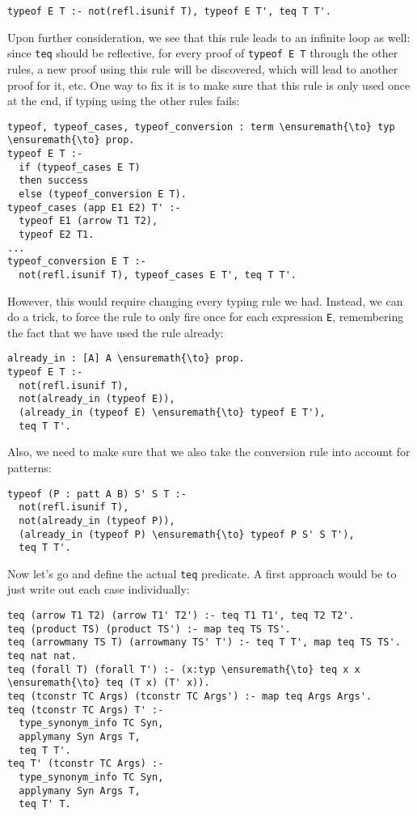 \begin{verbatim}
typeof E T :- not(refl.isunif T), typeof E T', teq T T'.
\end{verbatim}

Upon further consideration, we see that this rule leads to an infinite
loop as well: since \texttt{teq} should be reflective, for every proof
of \texttt{typeof\ E\ T\textquotesingle{}} through the other rules, a
new proof using this rule will be discovered, which will lead to another
proof for it, etc. One way to fix it is to make sure that this rule is
only used once at the end, if typing using the other rules fails:

\begin{verbatim}
typeof, typeof_cases, typeof_conversion : term \ensuremath{\to} typ \ensuremath{\to} prop.
typeof E T :-
  if (typeof_cases E T)
  then success
  else (typeof_conversion E T).
typeof_cases (app E1 E2) T' :-
  typeof E1 (arrow T1 T2),
  typeof E2 T1.
...
typeof_conversion E T :-
  not(refl.isunif T), typeof_cases E T', teq T T'.
\end{verbatim}

However, this would require changing every typing rule we had. Instead,
we can do a trick, to force the rule to only fire once for each
expression \texttt{E}, remembering the fact that we have used the rule
already:

\begin{verbatim}
already_in : [A] A \ensuremath{\to} prop.
typeof E T :-
  not(refl.isunif T),
  not(already_in (typeof E)),
  (already_in (typeof E) \ensuremath{\to} typeof E T'),
  teq T T'.
\end{verbatim}

Also, we need to make sure that we also take the conversion rule into
account for patterns:

\begin{verbatim}
typeof (P : patt A B) S' S T :-
  not(refl.isunif T),
  not(already_in (typeof P)),
  (already_in (typeof P) \ensuremath{\to} typeof P S' S T'),
  teq T T'.
\end{verbatim}

Now let's go and define the actual \texttt{teq} predicate. A first
approach would be to just write out each case individually:

\begin{verbatim}
teq (arrow T1 T2) (arrow T1' T2') :- teq T1 T1', teq T2 T2'.
teq (product TS) (product TS') :- map teq TS TS'.
teq (arrowmany TS T) (arrowmany TS' T') :- teq T T', map teq TS TS'.
teq nat nat.
teq (forall T) (forall T') :- (x:typ \ensuremath{\to} teq x x \ensuremath{\to} teq (T x) (T' x)).
teq (tconstr TC Args) (tconstr TC Args') :- map teq Args Args'.
teq (tconstr TC Args) T' :-
  type_synonym_info TC Syn,
  applymany Syn Args T,
  teq T T'.
teq T' (tconstr TC Args) :-
  type_synonym_info TC Syn,
  applymany Syn Args T,
  teq T' T.
\end{verbatim}

